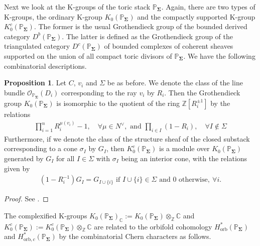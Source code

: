 \documentclass[11pt,reqno]{amsart}
\def\CC {{\mathbb C}}
\def\Z {{\mathbb Z}}
\def\PP {{\mathbb P}}
\theoremstyle{definition}
\newtheorem{proposition}[theorem]{Proposition}
\numberwithin{equation}{section}
\begin{document}
\smallskip

Next we look at the K-groups of the toric stack $\PP_{\mathbf{\Sigma}}$. Again, there are two types of K-groups, the ordinary K-group $K_0(\PP_{\mathbf{\Sigma}})$ and the compactly supported K-group $K_0^c(\PP_{\mathbf{\Sigma}})$. The former is the usual Grothendieck group of the bounded derived category $D^b(\PP_{\mathbf{\Sigma}})$. The latter is defined as the Grothendieck group of the triangulated category $D^c(\PP_{\mathbf{\Sigma}})$ of bounded complexes of coherent sheaves supported on the union of all compact toric divisors of $\PP_{\mathbf{\Sigma}}$. We have the following combinatorial descriptions.

\smallskip

\begin{proposition}
	Let $C$, $v_i$ and $\Sigma$ be as before. We denote the class of the line bundle $\mathcal{O}_{\PP_{\mathbf{\Sigma}}}(D_i)$ corresponding to the ray $v_i$ by $R_i$. Then the Grothendieck group $K_0(\PP_{\mathbf{\Sigma}})$ is isomorphic to the quotient of the ring $\Z[R_i^{\pm 1}]$ by the relations
	\begin{align*}
		\prod_{i=1}^n R_i^{\mu(v_i)}-1,\quad \forall\mu\in N^{\vee},\text{ and } \prod_{i\in I}(1-R_i),\quad \forall I\not\in\Sigma
	\end{align*}
	Furthermore, if we denote the class of the structure sheaf of the closed substack corresponding to a cone $\sigma_I$ by $G_I$, then $K_0^c(\PP_{\mathbf{\Sigma}})$ is a module over $K_0(\PP_{\mathbf{\Sigma}})$ generated by $G_I$ for all $I\in\Sigma$ with $\sigma_{I}$ being an interior cone, with the relations given by
	\begin{align*}
	(1-R_i^{-1})G_I=G_{I\cup\{i\}}\text{ if }I\cup\{i\}\in\Sigma \text{ and }0\text{ otherwise},\ \forall i.
    \end{align*}
\end{proposition}


\begin{proof}
	See \cite[Proposition 3.3, Definition 3.9]{BHconj}.
\end{proof}

\smallskip

The complexified K-groups $K_0(\PP_{\mathbf{\Sigma}})_{\CC}:=K_0(\PP_{\mathbf{\Sigma}})\otimes_{\Z}\CC$ and $K_0^c(\PP_{\mathbf{\Sigma}}):=K_0^c(\PP_{\mathbf{\Sigma}})\otimes_{\Z}\CC$ are related to the orbifold cohomology $H_{\mathrm{orb}}^*(\PP_{\mathbf{\Sigma}})$ and $H_{\mathrm{orb},c}^*(\PP_{\mathbf{\Sigma}})$ by the combinatorial Chern characters as follows.
\end{document}
